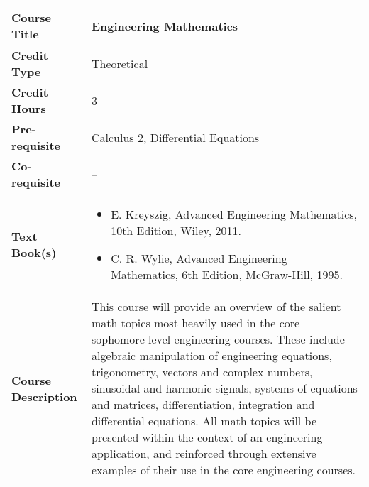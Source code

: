 \documentclass[11pt]{article}
\begin{document}
\begin{table}[h!]
\begin{tabular}{|l|l|}
\hline
\textbf{Course Title}       &   Engineering Mathematics\\ \hline
\textbf{Credit Type}        &   Theoretical \\ \hline
\textbf{Credit Hours}       &  3 \\ \hline
\textbf{Pre-requisite}       &  Calculus 2, Differential Equations \\ \hline
\textbf{Co-requisite}       &  -- \\ \hline
\textbf{Text Book(s)}       & \begin{minipage}{.70\textwidth}
\begin{itemize} \itemsep-0.4em
	\vspace{3mm}
	\item E. Kreyszig, Advanced Engineering Mathematics, 10th Edition, Wiley, 2011.
	\item C. R. Wylie, Advanced Engineering Mathematics, 6th Edition, McGraw-Hill, 1995.
	\vspace{3mm}
\end{itemize}
\end{minipage}\\ \hline
\textbf{Course Description} & \begin{minipage}{.70\textwidth}
\vspace{3mm}
This course will provide an overview of the salient math topics most heavily used
in the core sophomore-level engineering courses. These include algebraic manipulation of
engineering equations, trigonometry, vectors and complex numbers, sinusoidal and harmonic
signals, systems of equations and matrices, differentiation, integration and differential equations.
All math topics will be presented within the context of an engineering application, and reinforced
through extensive examples of their use in the core engineering courses.
\vspace{3mm}
\end{minipage} \\ \hline
\end{tabular}
\end{table}
\end{document}
